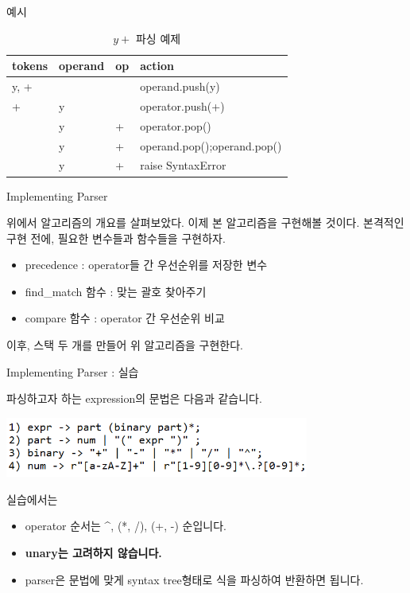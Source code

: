 \documentclass{beamer}
\begin{document}
\begin{frame}{예시}

\begin{table}[]
\centering
\caption{$y+$ 파싱 예제}
\label{my-label}
\begin{tabular}{|l|l|l|l|}
\hline
tokens & operand  & op  & action \\ \hline
y, + &     &  & operand.push(y)     \\ \hline
 + &  y   &  & operator.push(+)     \\ \hline
 &  y   & + & operator.pop()     \\ \hline
 &  y   & + & operand.pop();operand.pop()     \\ \hline
 &  y   & + & raise SyntaxError     \\ \hline
\end{tabular}
\end{table}

\end{frame}


\begin{frame}{Implementing Parser} 

위에서 알고리즘의 개요를 살펴보았다. 이제 본 알고리즘을 구현해볼 것이다. 본격적인 구현 전에, 필요한 변수들과 함수들을 구현하자. 
\begin{itemize} 
\item precedence : operator들 간 우선순위를 저장한 변수
\item find\_match 함수 : 맞는 괄호 찾아주기 
\item compare 함수 : operator 간 우선순위 비교
\end{itemize}

이후, 스택 두 개를 만들어 위 알고리즘을 구현한다. 
\end{frame}

\begin{frame}{Implementing Parser : 실습}
 
파싱하고자 하는 expression의 문법은 다음과 같습니다. 

\includegraphics[width=10cm,keepaspectratio]{simplegrammar}

실습에서는 
\begin{itemize} 
\item operator 순서는 \textasciicircum, (*, /), (+, -) 순입니다. 
\item \textbf{unary는 고려하지 않습니다.}
\item parser은 문법에 맞게 syntax tree형태로 식을 파싱하여 반환하면 됩니다. 
\end{itemize} 


\end{frame}
\end{document}
